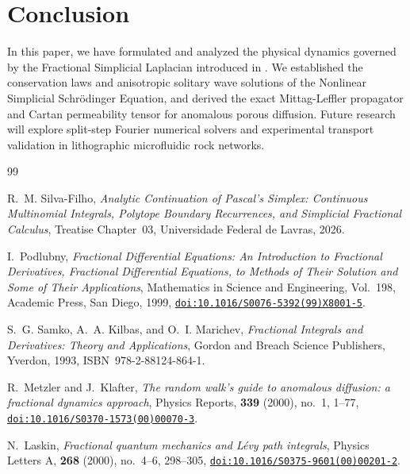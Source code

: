 \documentclass[11pt,a4paper]{article}
\theoremstyle{plain}
\theoremstyle{definition}
\theoremstyle{remark}
\numberwithin{equation}{section}
\providecommand{\doi}[1]{\href{https://doi.org/#1}{\texttt{doi:#1}}}
\begin{document}
\section{Conclusion}

In this paper, we have formulated and analyzed the physical dynamics governed by the Fractional Simplicial Laplacian introduced in \cite{silvafilho2026simplex}. We established the conservation laws and anisotropic solitary wave solutions of the Nonlinear Simplicial Schr\"odinger Equation, and derived the exact Mittag-Leffler propagator and Cartan permeability tensor for anomalous porous diffusion. Future research will explore split-step Fourier numerical solvers and experimental transport validation in lithographic microfluidic rock networks.

\begin{thebibliography}{99}

R.~M. Silva-Filho,
\emph{Analytic Continuation of Pascal's Simplex: Continuous Multinomial Integrals, Polytope Boundary Recurrences, and Simplicial Fractional Calculus},
Treatise Chapter~03, Universidade Federal de Lavras, 2026.

I.~Podlubny,
\emph{Fractional Differential Equations: An Introduction to Fractional Derivatives, Fractional Differential Equations, to Methods of Their Solution and Some of Their Applications},
Mathematics in Science and Engineering, Vol.~198, Academic Press, San Diego, 1999,
\doi{10.1016/S0076-5392(99)X8001-5}.

S.~G. Samko, A.~A. Kilbas, and O.~I. Marichev,
\emph{Fractional Integrals and Derivatives: Theory and Applications},
Gordon and Breach Science Publishers, Yverdon, 1993, ISBN~978-2-88124-864-1.

R.~Metzler and J.~Klafter,
\emph{The random walk's guide to anomalous diffusion: a fractional dynamics approach},
Physics Reports, \textbf{339} (2000), no.~1, 1--77,
\doi{10.1016/S0370-1573(00)00070-3}.

N.~Laskin,
\emph{Fractional quantum mechanics and L\'evy path integrals},
Physics Letters A, \textbf{268} (2000), no.~4--6, 298--305,
\doi{10.1016/S0375-9601(00)00201-2}.

\end{thebibliography}
\end{document}
